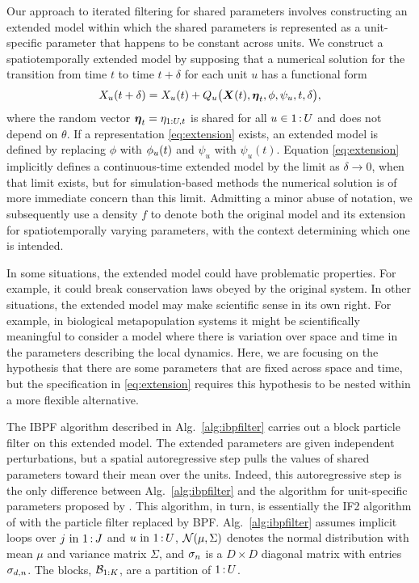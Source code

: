 \documentclass[12pt]{article}\usepackage[]{graphicx}\usepackage[]{xcolor}
\begin{document}
Our approach to iterated filtering for shared parameters involves constructing an extended model within which the shared parameters is represented as a unit-specific parameter that happens to be constant across units.
We construct a spatiotemporally extended model by supposing that a numerical solution for the transition from time $t$ to time $t+\delta$ for each unit $u$ has a functional form
\begin{equation}
\label{eq:extension}
  X_{u}(t+\delta) = X_u(t) + Q_u
    \big(\boldsymbol{X}(t),\boldsymbol{\eta}_t,\phi,\psi_{u},t,\delta \big),
\end{equation}
where the random vector $\boldsymbol{\eta}_t=\eta_{1:U,t}$ is shared for all $u\in {1}{\hspace{0.6mm}:\hspace{0.6mm}}{U}$ and does not depend on $\theta$.
If a representation \eqref{eq:extension} exists, an extended model is defined by replacing $\phi$ with $\phi_{u}(t)$ and $\psi_u$ with $\psi_{u}(t)$.
Equation \eqref{eq:extension} implicitly defines a continuous-time extended model by the limit as $\delta\to 0$, when that limit exists, but for simulation-based methods the numerical solution is of more immediate concern than this limit.
Admitting a minor abuse of notation, we subsequently use a density $f$ to denote both the original model and its extension for spatiotemporally varying parameters, with the context determining which one is intended.


In some situations, the extended model could have problematic properties.
For example, it could break conservation laws obeyed by the original system.
In other situations, the extended model may make scientific sense in its own right.
For example, in biological metapopulation systems it might be scientifically meaningful to consider a model where there is variation over space and time in the parameters describing the local dynamics.
Here, we are focusing on the hypothesis that there are some parameters that are fixed across space and time, but the specification in \eqref{eq:extension} requires this hypothesis to be nested within a more flexible alternative.

The IBPF algorithm described in Alg.~\ref{alg:ibpfilter} carries out a block particle filter on this extended model.
The extended parameters are given independent perturbations, but a spatial autoregressive step pulls the values of shared parameters toward their mean over the units.
Indeed, this autoregressive step is the only difference between  Alg.~\ref{alg:ibpfilter} and the algorithm for unit-specific parameters proposed by \citet{ning21-ibpf}.
This algorithm, in turn, is essentially the IF2 algorithm of \citet{ionides15} with the particle filter replaced by BPF.
Alg.~\ref{alg:ibpfilter} assumes implicit loops over $\np\ \text{in}\ \seq{1}{\Np}$ and $\unit\ \text{in}\ \seq{1}{\Unit}$, 
$\mathcal{N}(\mu,\Sigma)$ denotes the normal distribution with mean $\mu$ and variance matrix $\Sigma$, and
$\sigma_n$ is a $D\times D$ diagonal matrix with entries $\sigma_{d,n}$.
The blocks, $\mathcal{B}_{1:K}$, are a partition of ${1}{\hspace{0.6mm}:\hspace{0.6mm}}{U}$.
\end{document}
